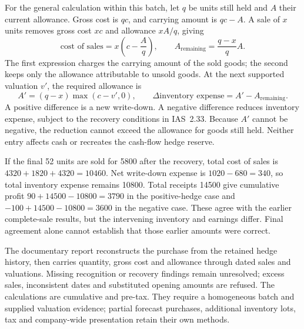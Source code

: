 For the general calculation within this batch, let $q $ be units still held and
$A$ their current allowance. Gross cost is $qc $, and carrying amount is $qc-A$.
A sale of $x $ units removes gross cost $xc $ and allowance $xA/q $, giving
\[
 \text{cost of sales}=x\left(c-\frac{A}{q}\right),
 \qquad A_{\mathrm{remaining}}=\frac{q-x}{q}A.
\]
The first expression charges the carrying amount of the sold goods; the
second keeps only the allowance attributable to unsold goods. At the next
supported valuation $v'$, the required allowance is
\[
 A'=(q-x)\max(c-v',0),\qquad
 \Delta\text{inventory expense}=A'-A_{\mathrm{remaining}}.
\]
A positive difference is a new write-down. A negative difference reduces
inventory expense, subject to the recovery conditions in IAS~2.33. Because
$A'$ cannot be negative, the reduction cannot exceed the allowance for goods
still held. Neither entry affects cash or recreates the cash-flow hedge reserve.

If the final 52 units are sold for 5800 after the recovery, total cost of sales
is $4320+1820+4320=10460$. Net write-down expense is $1020-680=340$, so total
inventory expense remains 10800. Total receipts 14500 give cumulative profit
$90+14500-10800=3790$ in the positive-hedge case and
$-100+14500-10800=3600$ in the negative case. These agree with the earlier
complete-sale results, but the intervening inventory and earnings differ.
Final agreement alone cannot establish that those earlier amounts were correct.

The documentary  report reconstructs the
purchase from the retained hedge history, then carries quantity, gross cost
and allowance through dated sales and valuations. Missing recognition or
recovery findings remain unresolved; excess sales, inconsistent dates and
substituted opening amounts are refused. The calculations are cumulative and
pre-tax. They require a homogeneous batch and supplied valuation evidence;
partial forecast purchases, additional inventory lots, tax and company-wide
presentation retain their own methods.\citep[IAS~2, paragraphs 25, 27--34]{eu20231803}
